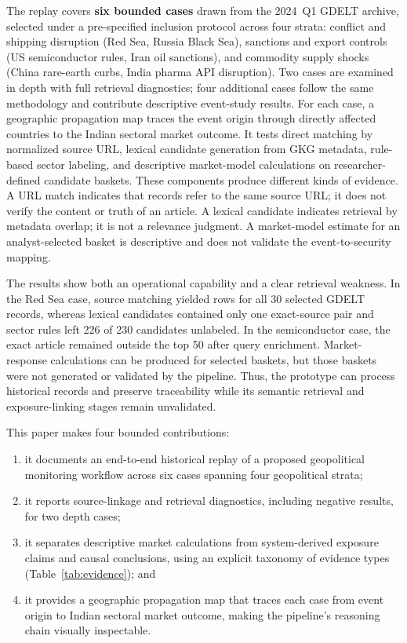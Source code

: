 \documentclass[10pt,a4paper,twocolumn]{article}
\begin{document}
The replay covers \textbf{six bounded cases} drawn from the 2024~Q1 GDELT archive, selected under a pre-specified inclusion protocol across four strata: conflict and shipping disruption (Red Sea, Russia Black Sea), sanctions and export controls (US semiconductor rules, Iran oil sanctions), and commodity supply shocks (China rare-earth curbs, India pharma API disruption). Two cases are examined in depth with full retrieval diagnostics; four additional cases follow the same methodology and contribute descriptive event-study results. For each case, a geographic propagation map traces the event origin through directly affected countries to the Indian sectoral market outcome. It tests direct matching by normalized source URL, lexical candidate generation from GKG metadata, rule-based sector labeling, and descriptive market-model calculations on researcher-defined candidate baskets. These components produce different kinds of evidence. A URL match indicates that records refer to the same source URL; it does not verify the content or truth of an article. A lexical candidate indicates retrieval by metadata overlap; it is not a relevance judgment. A market-model estimate for an analyst-selected basket is descriptive and does not validate the event-to-security mapping.

The results show both an operational capability and a clear retrieval weakness. In the Red Sea case, source matching yielded rows for all 30 selected GDELT records, whereas lexical candidates contained only one exact-source pair and sector rules left 226 of 230 candidates unlabeled. In the semiconductor case, the exact article remained outside the top 50 after query enrichment. Market-response calculations can be produced for selected baskets, but those baskets were not generated or validated by the pipeline. Thus, the prototype can process historical records and preserve traceability while its semantic retrieval and exposure-linking stages remain unvalidated.

This paper makes four bounded contributions:
\begin{enumerate}
  \item it documents an end-to-end historical replay of a proposed geopolitical monitoring workflow across six cases spanning four geopolitical strata;
  \item it reports source-linkage and retrieval diagnostics, including negative results, for two depth cases;
  \item it separates descriptive market calculations from system-derived exposure claims and causal conclusions, using an explicit taxonomy of evidence types (Table~\ref{tab:evidence}); and
  \item it provides a geographic propagation map that traces each case from event origin to Indian sectoral market outcome, making the pipeline's reasoning chain visually inspectable.
\end{enumerate}
\end{document}
